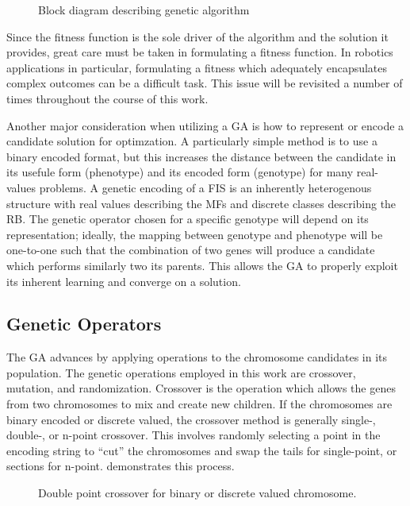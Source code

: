 \begin{figure}[ht]
    \centering
    
    \caption{Block diagram describing genetic algorithm}\label{f:ga_block}
\end{figure}

Since the fitness function is the sole driver of the algorithm and the solution it provides, great care must
be taken in formulating a fitness function. In robotics applications in particular, formulating a fitness which
adequately encapsulates complex outcomes can be a difficult task\cite{divband2015effect}. This issue will be
revisited a number of times throughout the course of this work.

Another major consideration when utilizing a GA is how to represent or encode a candidate solution for
optimzation. A particularly simple method is to use a binary encoded format\cite{cordon:01bk}, but this
increases the distance between the candidate in its usefule form (phenotype) and its encoded form (genotype)
for many real-values problems\cite{chakraborty1991chromosomal}. A genetic encoding of a FIS is an inherently
heterogenous structure with real values describing the MFs and discrete classes describing the RB. The genetic
operator chosen for a specific genotype will depend on its representation; ideally, the mapping between
genotype and phenotype will be one-to-one such that the combination of two genes will produce a candidate
which performs similarly two its parents. This allows the GA to properly exploit its inherent learning and
converge on a solution.

\subsection{Genetic Operators}
The GA advances by applying operations to the chromosome candidates in its population. The genetic operations
employed in this work are crossover,  mutation, and randomization. Crossover is the operation which allows the
genes from two chromosomes to mix and create new children. If the chromosomes are binary encoded or discrete
valued, the crossover method is generally single-, double-, or n-point crossover. This involves randomly
selecting a point in the encoding string to ``cut'' the chromosomes and swap the tails for single-point, or
sections for n-point.   demonstrates this process. 



\begin{figure}[ht]
    \centering
    
    \caption{Double point crossover for binary or discrete valued chromosome.}\label{f:dp_cx}
\end{figure}

